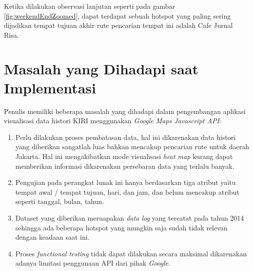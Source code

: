 Ketika dilakukan observasi lanjutan seperti pada gambar \ref{fig:weekendEndZoomed}, dapat terdapat sebuah hotspot yang paling sering dijadikan tempat tujuan akhir rute pencarian tempat ini adalah Cafe Jurnal Risa.




\section{Masalah yang Dihadapi saat Implementasi}
Penulis memiliki beberapa masalah yang dihadapi dalam   pengembangan aplikasi visualisasi data histori KIRI menggunakan \textit{Google Maps Javascript API}:
\begin{enumerate}
	\item Perlu dilakukan proses pembatasan data, hal ini dikarenakan data histori yang diberikan sangatlah luas bahkan mencakup pencarian rute untuk daerah Jakarta. Hal ini mengakibatkan mode visualisasi \textit{heat map} kurang dapat memberikan informasi dikarenakan persebaran data yang terlalu banyak.
	
	\item Pengujian pada perangkat lunak ini hanya berdasarkan tiga atribut yaitu tempat awal / tempat tujuan, hari, dan jam, dan belum mencakup atribut seperti tanggal, bulan, tahun.
	
	\item Dataset yang diberikan meruapakan \textit{data log} yang tercatat pada tahun 2014 sehingga ada beberapa hotspot yang mungkin saja sudah tidak relevan dengan keadaan saat ini.
	
	\item Proses \textit{functional testing} tidak dapat dilakukan secara maksimal dikarenakan adanya limitasi penggunaan API dari pihak \textit{Google}.
	
	
\end{enumerate}
